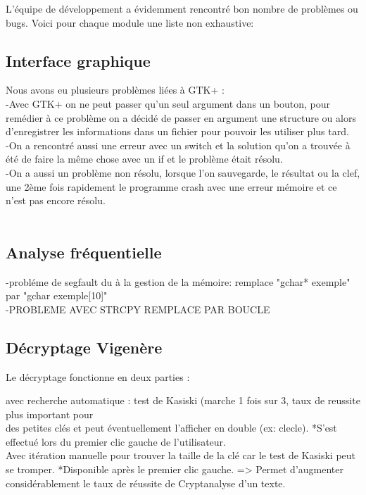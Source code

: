 \documentclass[a4]{article}
\begin{document}
	L'équipe de développement a évidemment rencontré bon nombre de problèmes ou bugs. Voici pour chaque
	module une liste non exhaustive:
	\subsection{Interface graphique}
	Nous avons eu plusieurs problèmes liées à GTK+ :\\
	-Avec GTK+ on ne peut passer qu'un seul argument dans un bouton, 
	pour remédier à ce problème on a décidé de passer en argument une structure ou alors d'enregistrer les informations 
  dans un fichier pour pouvoir les utiliser plus tard.\\
	-On a rencontré aussi une erreur avec un switch et la solution qu'on a trouvée à été de faire 
	la même chose avec un if et le problème était résolu.\\
	
	-On a aussi un problème non résolu, lorsque l'on sauvegarde, le résultat ou la clef, une 2ème fois rapidement le programme crash 
	avec une erreur mémoire et ce n'est pas encore résolu.\\
	\\
	
	\subsection{Analyse fréquentielle}
	-probléme de segfault du à la gestion de la mémoire: remplace "gchar* exemple" par "gchar exemple[10]"\\
	-PROBLEME AVEC STRCPY REMPLACE PAR BOUCLE
	\subsection{Décryptage Vigenère}
 		Le décryptage fonctionne en deux parties :
 		
 		avec recherche automatique : test de Kasiski (marche 1 fois sur 3, taux de reussite plus important pour \\
 		des petites clés et peut éventuellement l'afficher en double (ex: clecle). 
 		*S'est effectué lors du premier clic gauche de l'utilisateur. \\
 		
 		Avec itération manuelle pour trouver la taille de la clé car le test de Kasiski peut se tromper.
 		*Disponible après le premier clic gauche.
 		=> Permet d'augmenter considérablement le taux de réussite de Cryptanalyse d'un texte. \\
  		
\end{document}
